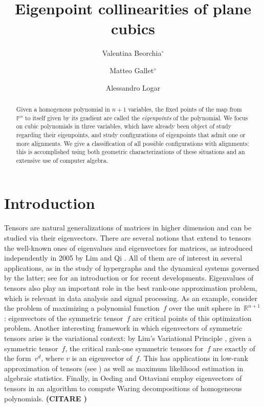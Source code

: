 \documentclass{amsart}
\title{Eigenpoint collinearities of plane cubics}
\author[Valentina Beorchia]{Valentina Beorchia$^{\circ}$}
\author[Matteo Gallet]{Matteo Gallet$^{\diamond}$}
\author[Alessandro Logar]{Alessandro Logar}
\date{}
\theoremstyle{plain}
\theoremstyle{definition}
\newcommand{\R}{\mathbb{R}}
\newcommand{\p}{\mathbb{P}}
\begin{document}
\begin{abstract}
 Given a homogenous polynomial in $n+1$ variables, the fixed points of the map from $\p^n$ to itself given by its gradient are called the \emph{eigenpoints} of the polynomial. We focus on cubic polynomials in three variables, which have already been object of study regarding their eigenpoints, and study configurations of eigenpoints that admit one or more alignments. We give a classification of all possible configurations with alignments: this is accomplished using both geometric characterizations of these situations and an extensive use of computer algebra.
\end{abstract}

\maketitle


\section{Introduction}
\label{introduction}

Tensors are natural generalizations of matrices in higher dimension and can be studied via their eigenvectors.
There are several notions that extend to tensors the well-known ones of eigenvalues and eigenvectors for matrices, 
as introduced independently in 2005 by Lim \cite{Lim} and Qi \cite{Qi}.
All of them are of interest in several applications, as in the study of hypergraphs and the dynamical systems governed by the latter;
see \cite[Section 4]{QZ} for an introduction or \cite{GMV} for recent developments.
Eigenvalues of tensors also play an important role in the best rank-one approximation problem, which is relevant in data analysis and signal processing.
As an example, consider the problem of maximizing a polynomial function~$f$ over the unit sphere in~$\R^{n+1}$: 
eigenvectors of the symmetric tensor~$f$ are critical points of this optimization problem. 
Another interesting framework in which eigenvectors of symmetric tensors arise is the variational context: 
by Lim's Variational Principle \cite{Lim}, given a symmetric tensor~$f$, the critical rank-one symmetric tensors for~$f$ are exactly of the form~$v^d$, where $v$ is an eigenvector of~$f$.
This has applications in low-rank approximation of tensors (see \cite{OttSod}) as well as maximum likelihood estimation in algebraic statistics. 
Finally, in \cite{OO} Oeding and Ottaviani employ eigenvectors of tensors in an algorithm to compute Waring decompositions of homogeneous polynomials. \textbf{(CITARE \cite{Ottaviani24})}
\end{document}
